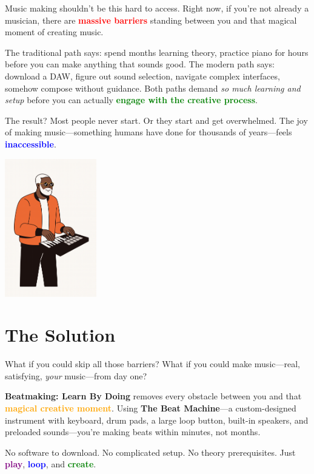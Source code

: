 \documentclass[11pt,letterpaper]{article}
\newcommand{\purple}[1]{\textcolor{purple}{\textbf{#1}}}
\newcommand{\bluepurple}[1]{\textcolor{blue}{\textbf{#1}}}
\newcommand{\greentext}[1]{\textcolor{green}{\textbf{#1}}}
\newcommand{\redtext}[1]{\textcolor{red}{\textbf{#1}}}
\newcommand{\orangetext}[1]{\textcolor{orange}{\textbf{#1}}}
\begin{document}
Music making shouldn't be this hard to access. Right now, if you're not already a musician, there are \redtext{massive barriers} standing between you and that magical moment of creating music.

The traditional path says: spend months learning theory, practice piano for hours before you can make anything that sounds good. The modern path says: download a DAW, figure out sound selection, navigate complex interfaces, somehow compose without guidance. Both paths demand \textit{so much learning and setup} before you can actually \greentext{engage with the creative process}.

The result? Most people never start. Or they start and get overwhelmed. The joy of making music—something humans have done for thousands of years—feels \bluepurple{inaccessible}.

\begin{center}
\includegraphics[width=0.3\textwidth]{Illustrations/Keys.png}
\end{center}

\section*{The Solution}

What if you could skip all those barriers? What if you could make music—real, satisfying, \textit{your} music—from day one?

\textbf{Beatmaking: Learn By Doing} removes every obstacle between you and that \orangetext{magical creative moment}. Using \textbf{The Beat Machine}—a custom-designed instrument with keyboard, drum pads, a large loop button, built-in speakers, and preloaded sounds—you're making beats within minutes, not months.

No software to download. No complicated setup. No theory prerequisites. Just \purple{play}, \bluepurple{loop}, and \greentext{create}.
\end{document}
